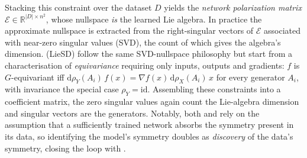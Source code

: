 \documentclass[mathematics,review,submit,moreauthors]{Definitions/mdpi}
\begin{document}
Stacking this constraint over the dataset $D$ yields the \emph{network polarization matrix} $\mathcal{E} \in \mathbb{R}^{|D| \times n^2}$, whose nullspace \emph{is} the learned Lie algebra.
In practice the approximate nullspace is extracted from the right-singular vectors of $\mathcal{E}$ associated with near-zero singular values (SVD), the count of which gives the algebra's dimension.
\citet{hu2025nn} (LieSD) follow the same SVD-nullspace philosophy but start from a characterisation of \emph{equivariance} requiring only inputs, outputs and gradients: $f$ is $G$-equivariant iff $\mathrm{d}\rho_Y(A_i)\,f(x) = \nabla f(x)\,\mathrm{d}\rho_X(A_i)\,x$ for every generator $A_i$, with invariance the special case $\rho_Y = \mathrm{id}$.
Assembling these constraints into a coefficient matrix, the zero singular values again count the Lie-algebra dimension and singular vectors are the generators.\newline
Notably, both \citet{krippendorf2020} and \citet{hu2025nn} rely on the assumption that a sufficiently trained network absorbs the symmetry present in its data, so identifying the model's symmetry doubles as \emph{discovery} of the data's symmetry, closing the loop with .
\end{document}
